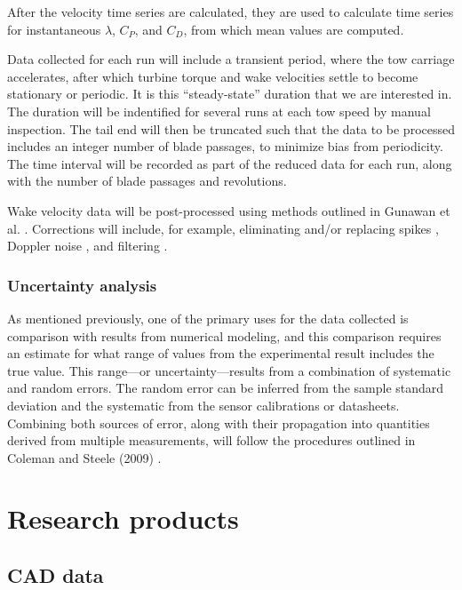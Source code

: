 \documentclass[12pt,letterpaper]{scrreprt}
\begin{document}
After the velocity time series are calculated, they are used to calculate time
series for instantaneous $\lambda$, $C_P$, and $C_D$, from which mean values are
computed.

Data collected for each run will include a transient period, where the tow
carriage accelerates, after which turbine torque and wake velocities settle to
become stationary or periodic. It is this ``steady-state'' duration that we are
interested in. The duration will be indentified for several runs at each tow
speed by manual inspection. The tail end will then be truncated such that the
data to be processed includes an integer number of blade passages, to minimize
bias from periodicity. The time interval will be recorded as part of the reduced
data for each run, along with the number of blade passages and revolutions.

Wake velocity data will be post-processed using methods outlined in Gunawan et
al. \cite{Gunawan2011}. Corrections will include, for example, eliminating
and/or replacing spikes \cite{Goring2002}, Doppler noise \cite{Voulgaris1998},
and filtering \cite{Garcia2005}.

\subsection{Uncertainty analysis}

As mentioned previously, one of the primary uses for the data collected is
comparison with results from numerical modeling, and this comparison requires an
estimate for what range of values from the experimental result includes the true
value. This range---or uncertainty---results from a combination of systematic
and random errors. The random error can be inferred from
the sample standard deviation and the systematic from the sensor calibrations or
datasheets. Combining both sources of error, along with their propagation into quantities derived from multiple measurements, will follow the procedures outlined in Coleman and Steele (2009) \cite{ColemanSteele}.



\chapter{Research products}

\section{CAD data}
\end{document}
